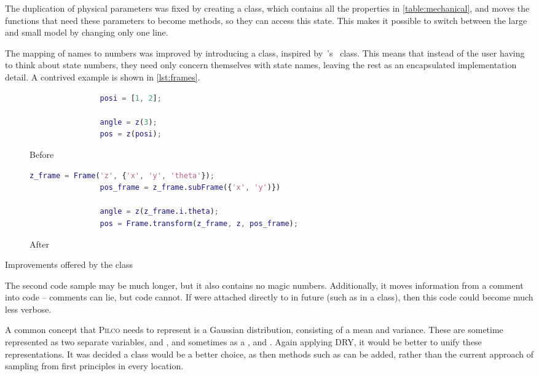 \documentclass[main.tex]{subfiles}
\begin{document}
	The duplication of physical parameters was fixed by creating a  class, which contains all the properties in \cref{table:mechanical}, and moves the functions that need these parameters to become methods, so they can access this state.
	This makes it possible to switch between the large and small model by changing only one line.

	The mapping of names to numbers was improved by introducing a  class, inspired by~'s~\cite{drake}  class.
	This means that instead of the user having to think about state numbers, they need only concern themselves with state names, leaving the rest as an encapsulated implementation detail.
	A contrived example is shown in \cref{lst:frames}.

	\begin{listingfloat}
		\centering
		\begin{subfigure}{0.4\linewidth-1em}
			\begin{lstlisting}[language=matlab,frame=single,gobble=8]
				% coords are x, y, theta
				posi = [1, 2];

				angle = z(3);
				pos = z(posi);
			\end{lstlisting}
			\caption{Before}
		\end{subfigure}
		\hfill
		\begin{subfigure}{0.6\linewidth-1em}
			\begin{lstlisting}[language=matlab,frame=single,gobble=8]
				z_frame = Frame('z', {'x', 'y', 'theta'});
				pos_frame = z_frame.subFrame({'x', 'y')})

				angle = z(z_frame.i.theta);
				pos = Frame.transform(z_frame, z, pos_frame);
			\end{lstlisting}
			\caption{After}
		\end{subfigure}
		\caption{Improvements offered by the  class}
		\label{lst:frames}
		\medskip
		\small
		The second code sample may be much longer, but it also contains no magic numbers.
		Additionally, it moves information from a comment into code -- comments can lie, but code cannot.
		If  were attached directly to  in future (such as in a  class), then this code could become much less verbose.
	\end{listingfloat}

	A common concept that \textsc{Pilco} needs to represent is a Gaussian distribution, consisting of a mean and variance.
	These are sometime represented as two separate variables,  and , and sometimes as a ,  and .
	Again applying DRY, it would be better to unify these representations.
	It was decided a class would be a better choice, as then methods such as  can be added, rather than the current approach of sampling from first principles in every location.
\end{document}
